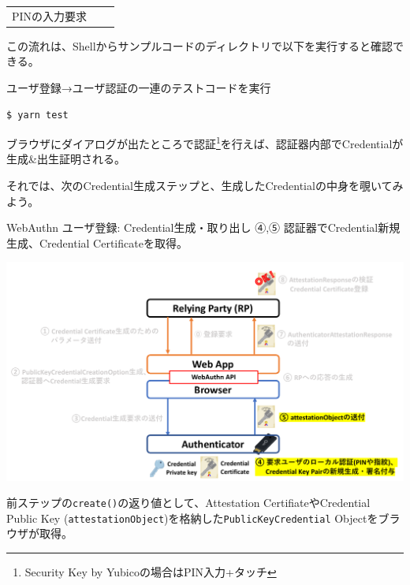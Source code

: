 \documentclass[12pt,dvipdfmx,uplatex]{beamer}
\begin{document}
\begin{frame}[fragile]
\begin{tabular}{ccc}
\begin{minipage}{0.4\linewidth}
 {\footnotesize PINの入力要求}
\end{minipage}
\end{tabular}
\end{frame}

\begin{frame}[fragile]
この流れは、Shellからサンプルコードのディレクトリで以下を実行すると確認できる。
\begin{exampleblock}{\footnotesize ユーザ登録→ユーザ認証の一連のテストコードを実行}
{\footnotesize
\begin{verbatim}
$ yarn test
\end{verbatim}
}
\end{exampleblock}

\vspace{2ex}
ブラウザにダイアログが出たところで認証\footnote[frame]{\scriptsize Security Key by Yubicoの場合はPIN入力+タッチ}を行えば、\alert{認証器内部でCredentialが生成\&出生証明される。}

\vspace{2ex}
それでは、次のCredential生成ステップと、生成したCredentialの中身を覗いてみよう。
\end{frame}

\begin{frame}{WebAuthn ユーザ登録: Credential生成・取り出し}
\small
④,⑤ 認証器でCredential新規生成、Credential Certificateを取得。
\begin{center}
 \includegraphics[width=0.9\linewidth]{Figs/webauthn-registration3.pdf}
\end{center}
前ステップの\texttt{create()}の返り値として、Attestation CertifiateやCredential Public Key (\texttt{attestationObject})を格納した\texttt{PublicKeyCredential} Objectをブラウザが取得。
\end{frame}
\end{document}
